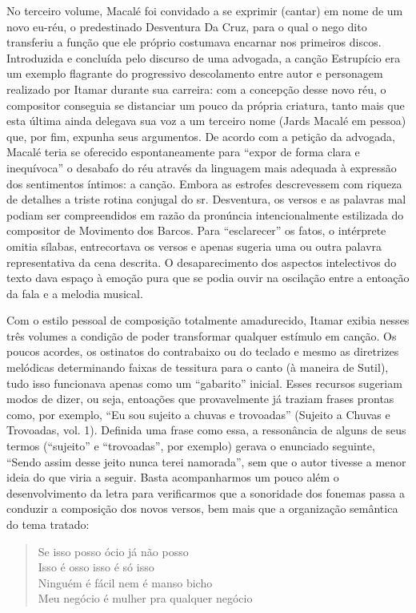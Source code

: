 No terceiro volume, Macalé foi convidado a se exprimir (cantar) em nome
de um novo eu-réu, o predestinado Desventura Da Cruz, para o qual o nego
dito transferiu a função que ele próprio costumava encarnar nos
primeiros discos. Introduzida e concluída pelo discurso de uma advogada,
a canção Estrupício era um exemplo flagrante do progressivo descolamento
entre autor e personagem realizado por Itamar durante sua carreira: com
a concepção desse novo réu, o compositor conseguia se distanciar um
pouco da própria criatura, tanto mais que esta última ainda delegava sua
voz a um terceiro nome (Jards Macalé em pessoa) que, por fim, expunha
seus argumentos. De acordo com a petição da advogada, Macalé teria se
oferecido espontaneamente para ``expor de forma clara e inequívoca'' o
desabafo do réu através da linguagem mais adequada à expressão dos
sentimentos íntimos: a canção. Embora as estrofes descrevessem com
riqueza de detalhes a triste rotina conjugal do sr. Desventura, os
versos e as palavras mal podiam ser compreendidos em razão da pronúncia
intencionalmente estilizada do compositor de Movimento dos Barcos. Para
``esclarecer'' os fatos, o intérprete omitia sílabas, entrecortava os
versos e apenas sugeria uma ou outra palavra representativa da cena
descrita. O desaparecimento dos aspectos intelectivos do texto dava
espaço à emoção pura que se podia ouvir na oscilação entre a entoação da
fala e a melodia musical.

Com o estilo pessoal de composição totalmente amadurecido, Itamar exibia
nesses três volumes a condição de poder transformar qualquer estímulo em
canção. Os poucos acordes, os ostinatos do contrabaixo ou do teclado e
mesmo as diretrizes melódicas determinando faixas de tessitura para o
canto (à maneira de Sutil), tudo isso funcionava apenas como um
``gabarito'' inicial. Esses recursos sugeriam modos de dizer, ou seja,
entoações que provavelmente já traziam frases prontas como, por exemplo,
``Eu sou sujeito a chuvas e trovoadas'' (Sujeito a Chuvas e Trovoadas,
vol. 1). Definida uma frase como essa, a ressonância de alguns de seus
termos (``sujeito'' e ``trovoadas'', por exemplo) gerava o enunciado
seguinte, ``Sendo assim desse jeito nunca terei namorada'', sem que o
autor tivesse a menor ideia do que viria a seguir. Basta acompanharmos
um pouco além o desenvolvimento da letra para verificarmos que a
sonoridade dos fonemas passa a conduzir a composição dos novos versos,
bem mais que a organização semântica do tema tratado:

\begin{verse}
Se isso posso ócio já não posso\\
Isso é osso isso é só isso\\
Ninguém é fácil nem é manso bicho\\
Meu negócio é mulher pra qualquer negócio
\end{verse}

